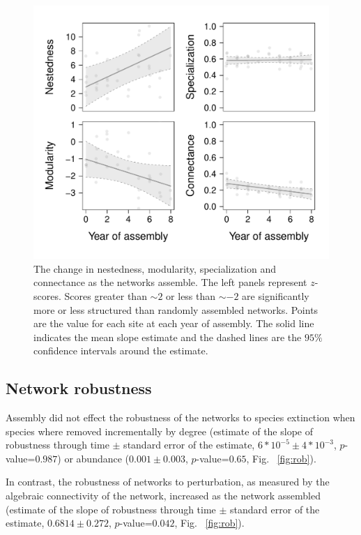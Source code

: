 \documentclass[12pt]{article}
\begin{document}
\begin{figure}
  \centering
  \includegraphics[width=.7\textwidth]{../analysis/networkLevel/figures/baci.pdf}
  \caption{The change in nestedness, modularity, specialization and
    connectance as the networks assemble. The left panels represent
    $z$-scores. Scores greater than $\sim 2$ or less than $\sim -2$
    are significantly more or less structured than randomly assembled
    networks. Points are the value for each site at each year of
    assembly. The solid line indicates the mean slope estimate and the
    dashed lines are the $95\%$ confidence intervals around the
    estimate.}
  \label{fig:baci}
\end{figure}
\clearpage

\subsection*{Network robustness}
Assembly did not effect the robustness of the networks to species
extinction when species where removed incrementally by degree
(estimate of the slope of robustness through time $\pm$ standard error
of the estimate, $6*10^{-5} \pm 4*10^{-3}$, $p$-value=$0.987$) or
abundance ($0.001 \pm 0.003$, $p$-value=$0.65$, Fig.~ \ref{fig:rob}).

In contrast, the robustness of networks to perturbation, as measured
by the algebraic connectivity of the network, increased as the network
assembled (estimate of the slope of robustness through time $\pm$
standard error of the estimate, $0.6814 \pm 0.272$, $p$-value=$0.042$,
Fig.~ \ref{fig:rob}).
\end{document}
